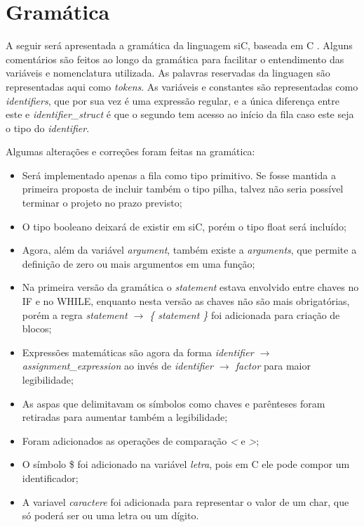 \documentclass[12pt]{article}
\begin{document}
\section{Gramática}

\indent A seguir será apresentada a gramática da linguagem siC, baseada em C \cite{yacc}. Alguns comentários são feitos ao longo da gramática para facilitar o entendimento das variáveis e nomenclatura utilizada. As palavras reservadas da linguagen são representadas aqui como \textit{tokens}. As variáveis e constantes são representadas como \textit{identifiers}, que por sua vez é uma expressão regular, e a única diferença entre este e \textit{identifier\_struct} é que o segundo tem acesso ao início da fila caso este seja o tipo do \textit{identifier}. 

\indent Algumas alterações e correções foram feitas na gramática:

\begin{itemize}
	\item Será implementado apenas a fila como tipo primitivo. Se fosse mantida a primeira proposta de incluir também o tipo pilha, talvez não seria possível terminar o projeto no prazo previsto;
	\item O tipo booleano deixará de existir em siC, porém o tipo float será incluído;
	\item Agora, além da variável \textit{argument}, também existe a \textit{arguments}, que permite a definição de zero ou mais argumentos em uma função;
	\item Na primeira versão da gramática o \textit{statement} estava envolvido entre chaves no IF e no WHILE, enquanto nesta versão as chaves não são mais obrigatórias, porém a regra \textit{statement $\rightarrow$ \{ statement \}} foi adicionada para criação de blocos;
	\item Expressões matemáticas são agora da forma \textit{identifier $\rightarrow$ assignment\_expression} ao invés de \textit{identifier $\rightarrow$ factor} para maior legibilidade;
	\item As aspas que delimitavam os símbolos como chaves e parênteses foram retiradas para aumentar também a legibilidade;
	\item Foram adicionados as operações de comparação \textit{<} e \textit{>};
	\item O símbolo \$ foi adicionado na variável \textit{letra}, pois em C ele pode compor um identificador;
	\item A variavel \textit{caractere} foi adicionada para representar o valor de um char, que só poderá ser ou uma letra ou um dígito.
\end{itemize}
\end{document}
